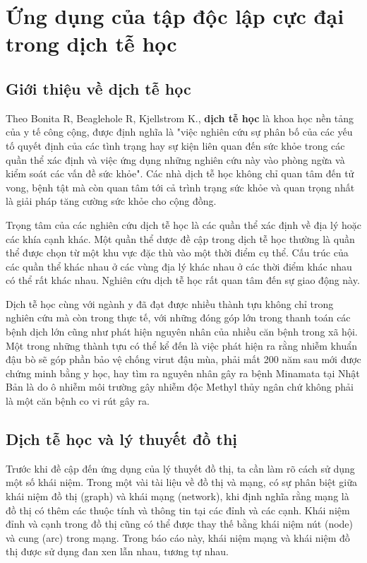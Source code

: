 \documentclass[14pt, oneside, a4paper, openany]{scrartcl}
\begin{document}


\newpage
\section{Ứng dụng của tập độc lập cực đại trong dịch tễ học}
\subsection{Giới thiệu về dịch tễ học}
Theo Bonita R, Beaglehole R, Kjellstrom K.\cite{BasicEpid}, \textbf{dịch tễ học}   là khoa học nền tảng của y tế công cộng, được định nghĩa là "việc nghiên cứu sự phân bố của các yếu tố quyết định của các tình trạng hay sự kiện liên quan đến sức khỏe trong các quần thể xác định và việc ứng dụng những nghiên cứu này vào phòng ngừa và kiểm soát các vấn đề sức khỏe". 
Các nhà dịch tễ học không chỉ quan tâm đến tử vong, bệnh tật mà còn quan tâm tới cả trình trạng sức khỏe và quan trọng nhất là giải pháp tăng cường sức khỏe cho cộng đồng.

Trọng tâm của các nghiên cứu dịch tễ học là các quần thể xác định về địa lý hoặc các khía cạnh khác. Một quần thể dược đề cập trong dịch tễ học thường là quần thể được chọn từ một khu vực đặc thù vào một thời điểm cụ thể. Cấu trúc của các quần thể khác nhau ở các vùng địa lý khác nhau ở các thời điểm khác nhau có thể rất khác nhau. Nghiên cứu dịch tễ học rất quan tâm đến sự giao động này.

Dịch tễ học cùng với ngành y đã đạt được nhiều thành tựu không chỉ trong nghiên cứu mà còn trong thực tế, với những đóng góp lớn trong thanh toán các bệnh dịch lớn cũng như phát hiện nguyên nhân của nhiều căn bệnh trong xã hội. 
Một trong những thành tựu có thể kể đến là việc phát hiện ra rằng nhiễm khuẩn đậu bò sẽ góp phần bảo vệ chống virut đậu mùa, phải mất 200 năm sau mới được chứng minh bằng y học, hay tìm ra nguyên nhân gây ra bệnh Minamata tại Nhật Bản là do ô nhiễm môi trường gây nhiễm độc Methyl thủy ngân chứ không phải là một căn bệnh co vi rút gây ra.

\subsection{Dịch tễ học và lý thuyết đồ thị}
Trước khi đề cập đến ứng dụng của lý thuyết đồ thị, ta cần làm rõ cách sử dụng một số khái niệm. Trong một vài tài liệu về đồ thị và mạng, có sự phân biệt giữa khái niệm đồ thị (graph) và khái mạng (network), khi định nghĩa rằng mạng là đồ thị có thêm các thuộc tính và thông tin tại các đỉnh và các cạnh. Khái niệm đỉnh và cạnh trong đồ thị cũng có thể được thay thế bằng khái niệm nút (node) và cung (arc) trong mạng. Trong báo cáo này, khái niệm mạng và khái niệm đồ thị được sử dụng đan xen lẫn nhau, tương tự nhau.
\end{document}

